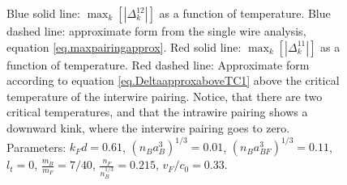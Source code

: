 \begin{figure} 
\begin{center}  
  
\caption{Blue solid line: $\max_k[|\Delta^{12}_k|]$ as a function of temperature. Blue dashed line: approximate form from the single wire analysis, equation \eqref{eq.maxpairingapprox}. Red solid line: $\max_k[|\Delta^{11}_k|]$ as a function of temperature. Red dashed line: Approximate form according to equation \eqref{eq.DeltaapproxaboveTC1} above the critical temperature of the interwire pairing. Notice, that there are two critical temperatures, and that the intrawire pairing shows a downward kink, where the interwire pairing goes to zero. Parameters: $k_Fd = 0.61$, $(n_Ba_B^3)^{1/3} = 0.01$, $(n_Ba_{BF}^3)^{1/3} = 0.11$, $l_t = 0$, $\frac{m_B}{m_F} = 7/40$, $\frac{n_F}{n_B^{1/3}} = 0.215$, $v_F/c_0 = 0.33$.}  
\label{fig.maximalpairingsTdepend_2wires}  
\end{center}    
\end{figure} 

